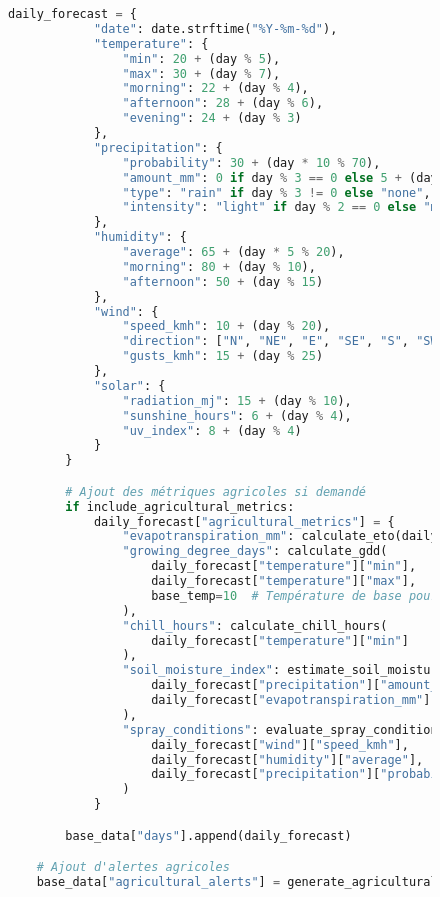 \begin{figure}[h]
\begin{lstlisting}[language=Python, caption=Implémentation d'outils spécialisés pour l'agriculture]
        daily_forecast = {
            "date": date.strftime("%Y-%m-%d"),
            "temperature": {
                "min": 20 + (day % 5),
                "max": 30 + (day % 7),
                "morning": 22 + (day % 4),
                "afternoon": 28 + (day % 6),
                "evening": 24 + (day % 3)
            },
            "precipitation": {
                "probability": 30 + (day * 10 % 70),
                "amount_mm": 0 if day % 3 == 0 else 5 + (day * 3),
                "type": "rain" if day % 3 != 0 else "none",
                "intensity": "light" if day % 2 == 0 else "moderate"
            },
            "humidity": {
                "average": 65 + (day * 5 % 20),
                "morning": 80 + (day % 10),
                "afternoon": 50 + (day % 15)
            },
            "wind": {
                "speed_kmh": 10 + (day % 20),
                "direction": ["N", "NE", "E", "SE", "S", "SW", "W", "NW"][day % 8],
                "gusts_kmh": 15 + (day % 25)
            },
            "solar": {
                "radiation_mj": 15 + (day % 10),
                "sunshine_hours": 6 + (day % 4),
                "uv_index": 8 + (day % 4)
            }
        }

        # Ajout des métriques agricoles si demandé
        if include_agricultural_metrics:
            daily_forecast["agricultural_metrics"] = {
                "evapotranspiration_mm": calculate_eto(daily_forecast),
                "growing_degree_days": calculate_gdd(
                    daily_forecast["temperature"]["min"],
                    daily_forecast["temperature"]["max"],
                    base_temp=10  # Température de base pour le maïs
                ),
                "chill_hours": calculate_chill_hours(
                    daily_forecast["temperature"]["min"]
                ),
                "soil_moisture_index": estimate_soil_moisture(
                    daily_forecast["precipitation"]["amount_mm"],
                    daily_forecast["evapotranspiration_mm"]
                ),
                "spray_conditions": evaluate_spray_conditions(
                    daily_forecast["wind"]["speed_kmh"],
                    daily_forecast["humidity"]["average"],
                    daily_forecast["precipitation"]["probability"]
                )
            }

        base_data["days"].append(daily_forecast)

    # Ajout d'alertes agricoles
    base_data["agricultural_alerts"] = generate_agricultural_alerts(base_data)


\end{lstlisting}
\end{figure}
